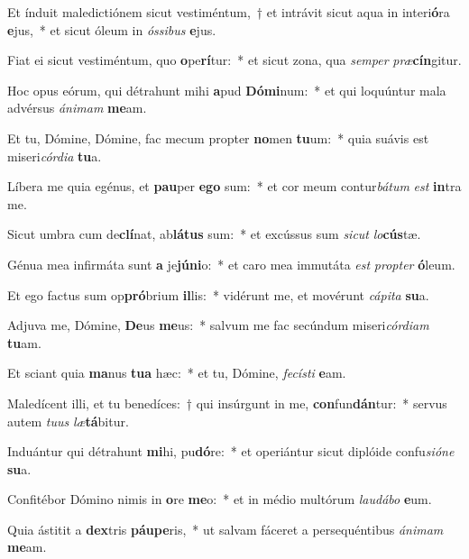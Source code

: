 \item Et índuit maledictiónem sicut vestiméntum,~† et intrávit sicut aqua in interi\textbf{ó}ra \textbf{e}jus,~* et sicut óleum in \textit{ós}\textit{si}\textit{bus} \textbf{e}jus.
\item Fiat ei sicut vestiméntum, quo \textbf{o}pe\textbf{rí}tur:~* et sicut zona, qua \textit{sem}\textit{per} \textit{præ}\textbf{cín}gitur.
\item Hoc opus eórum, qui détrahunt mihi \textbf{a}pud \textbf{Dó}\textbf{mi}num:~* et qui loquúntur mala advérsus \textit{á}\textit{ni}\textit{mam} \textbf{me}am.
\item Et tu, Dómine, Dómine, fac mecum propter \textbf{no}men \textbf{tu}um:~* quia suávis est miseri\textit{cór}\textit{di}\textit{a} \textbf{tu}a.
\item Líbera me quia egénus, et \textbf{pau}per \textbf{e}\textbf{go} sum:~* et cor meum contur\textit{bá}\textit{tum} \textit{est} \textbf{in}tra me.
\item Sicut umbra cum de\textbf{clí}nat, ab\textbf{lá}\textbf{tus} sum:~* et excússus sum \textit{sic}\textit{ut} \textit{lo}\textbf{cús}tæ.
\item Génua mea infirmáta sunt \textbf{a} je\textbf{jú}\textbf{ni}o:~* et caro mea immutáta \textit{est} \textit{prop}\textit{ter} \textbf{ó}leum.
\item Et ego factus sum op\textbf{pró}brium \textbf{il}lis:~* vidérunt me, et movérunt \textit{cá}\textit{pi}\textit{ta} \textbf{su}a.
\item Adjuva me, Dómine, \textbf{De}us \textbf{me}us:~* salvum me fac secúndum miseri\textit{cór}\textit{di}\textit{am} \textbf{tu}am.
\item Et sciant quia \textbf{ma}nus \textbf{tu}\textbf{a} hæc:~* et tu, Dómine, \textit{fe}\textit{cís}\textit{ti} \textbf{e}am.
\item Maledícent illi, et tu benedíces:~† qui insúrgunt in me, \textbf{con}fun\textbf{dán}tur:~* servus autem \textit{tu}\textit{us} \textit{læ}\textbf{tá}bitur.
\item Induántur qui détrahunt \textbf{mi}hi, pu\textbf{dó}re:~* et operiántur sicut diplóide confu\textit{si}\textit{ó}\textit{ne} \textbf{su}a.
\item Confitébor Dómino nimis in \textbf{o}re \textbf{me}o:~* et in médio multórum \textit{lau}\textit{dá}\textit{bo} \textbf{e}um.
\item Quia ástitit a \textbf{dex}tris \textbf{páu}\textbf{pe}ris,~* ut salvam fáceret a persequéntibus \textit{á}\textit{ni}\textit{mam} \textbf{me}am.
